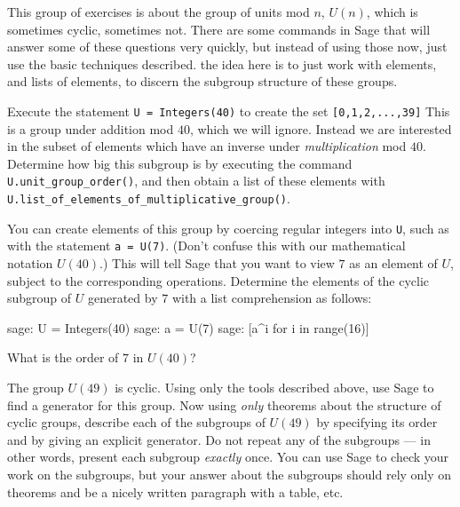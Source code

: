This group of exercises is about the group of units mod $n$, $U(n)$, which is sometimes cyclic, sometimes not.  There are some commands in Sage that will answer some of these questions very quickly, but instead of using those now, just use the basic techniques described.  the idea here is to just work with elements, and lists of elements, to discern the subgroup structure of these groups.\par
\begin{sageverbatim}\end{sageverbatim}
%
%
Execute the statement \verb?U = Integers(40)? to create the set \verb?[0,1,2,...,39]?  This is a group under addition mod $40$, which we will ignore.  Instead we are interested in the subset of elements which have an inverse under \emph{multiplication} mod $40$.  Determine how big this subgroup is by executing the command \verb?U.unit_group_order()?, and then obtain a list of these elements with \verb?U.list_of_elements_of_multiplicative_group()?.\par
\begin{sageverbatim}\end{sageverbatim}
%
%
You can create elements of this group by coercing regular integers into \verb?U?, such as  with the statement \verb?a = U(7)?.  (Don't confuse this with our mathematical notation $U(40)$.)  This will tell Sage that you want to view $7$ as an element of $U$, subject to the corresponding operations.  Determine the elements of the cyclic subgroup of $U$ generated by $7$ with a list comprehension as follows:
%
\begin{sageverbatim}
sage: U = Integers(40)
sage: a = U(7)
sage: [a^i for i in range(16)]
\end{sageverbatim}
%
What is the order of $7$ in $U(40)$?\par
\begin{sageverbatim}\end{sageverbatim}
%
%
The group $U(49)$ is cyclic.  Using only the tools described above, use Sage to find a generator for this group.  Now using \emph{only} theorems about the structure of cyclic groups, describe each of the subgroups of $U(49)$ by specifying its order and by giving an explicit generator.  Do not repeat any of the subgroups --- in other words, present each subgroup \emph{exactly} once.  You can use Sage to check your work on the subgroups, but your answer about the subgroups should rely only on theorems and be a nicely written paragraph with a table, etc.\par
